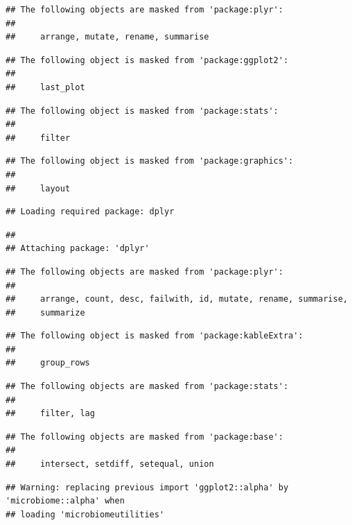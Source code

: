 \documentclass[
]{article}
\begin{document}
\begin{verbatim}
## The following objects are masked from 'package:plyr':
## 
##     arrange, mutate, rename, summarise
\end{verbatim}

\begin{verbatim}
## The following object is masked from 'package:ggplot2':
## 
##     last_plot
\end{verbatim}

\begin{verbatim}
## The following object is masked from 'package:stats':
## 
##     filter
\end{verbatim}

\begin{verbatim}
## The following object is masked from 'package:graphics':
## 
##     layout
\end{verbatim}

\begin{verbatim}
## Loading required package: dplyr
\end{verbatim}

\begin{verbatim}
## 
## Attaching package: 'dplyr'
\end{verbatim}

\begin{verbatim}
## The following objects are masked from 'package:plyr':
## 
##     arrange, count, desc, failwith, id, mutate, rename, summarise,
##     summarize
\end{verbatim}

\begin{verbatim}
## The following object is masked from 'package:kableExtra':
## 
##     group_rows
\end{verbatim}

\begin{verbatim}
## The following objects are masked from 'package:stats':
## 
##     filter, lag
\end{verbatim}

\begin{verbatim}
## The following objects are masked from 'package:base':
## 
##     intersect, setdiff, setequal, union
\end{verbatim}

\begin{verbatim}
## Warning: replacing previous import 'ggplot2::alpha' by 'microbiome::alpha' when
## loading 'microbiomeutilities'
\end{verbatim}
\end{document}

